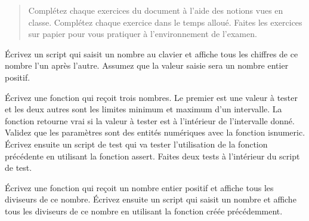 \documentclass[french]{article}
\begin{document}
\thispagestyle{plain}
\noindent{}


\renewcommand{\abstractname}{Instructions}
\begin{abstract}
	Complétez chaque exercices du document à l’aide des notions vues en classe. Complétez chaque exercice dans le temps alloué. Faites les exercices sur papier pour vous pratiquer à l'environnement de l'examen.
\end{abstract}
\bigskip

\begin{question}{6}
	Écrivez un script qui saisit un nombre au clavier et affiche tous les chiffres de ce nombre l'un après l'autre. Assumez que la valeur saisie sera un nombre entier positif.
\end{question}
\vfill
\begin{solution}
	
\end{solution}
\newpage

\begin{question}{5}
	Écrivez une fonction qui reçoit trois nombres. Le premier est une valeur à tester et les deux autres sont les limites minimum et maximum d'un intervalle. La fonction retourne vrai si la valeur à tester est à l'intérieur de l'intervalle donné. Validez que les paramètres sont des entités numériques avec la fonction isnumeric.
	Écrivez ensuite un script de test qui va tester l'utilisation de la fonction précédente en utilisant la fonction assert. Faites deux tests à l'intérieur du script de test.
\end{question}
\vfill
\begin{solution}
	
	
\end{solution}
\newpage

\begin{question}{6}
	Écrivez une fonction qui reçoit un nombre entier positif et affiche tous les diviseurs de ce nombre.
	Écrivez ensuite un script qui saisit un nombre et affiche tous les diviseurs de ce nombre en utilisant la fonction créée précédemment.
\end{question}
\vfill
\begin{solution}
	
	
\end{solution}
\newpage
\end{document}
